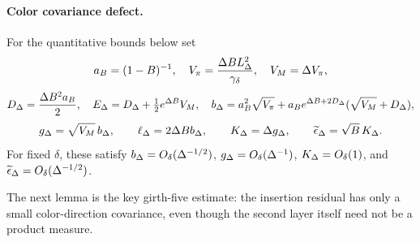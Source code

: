 \paragraph{Color covariance defect.}
For the quantitative bounds below set
\[
 a_B=(1-B)^{-1},\quad V_\pi=\frac{\Delta B L_\Delta^2}{\gamma_\delta},\quad
 V_M=\Delta V_\pi,
\]
\[
 D_\Delta=\frac{\Delta B^2a_B}{2},\quad
 E_\Delta=D_\Delta+\tfrac12e^{\Delta B}V_M,\quad
 b_\Delta=a_B^2\sqrt{V_\pi}+a_Be^{\Delta B+2D_\Delta}
 (\sqrt{V_M}+D_\Delta),
\]
\begin{equation}\label{eq:girth5-defect-constants}
 g_\Delta=\sqrt{V_M}\,b_\Delta,\qquad
 \ell_\Delta=2\Delta B b_\Delta,\qquad K_\Delta=\Delta g_\Delta,\qquad
 \widetilde\epsilon_\Delta=\sqrt B\,K_\Delta.
\end{equation}
For fixed $\delta$, these satisfy
$b_\Delta=O_\delta(\Delta^{-1/2})$, $g_\Delta=O_\delta(\Delta^{-1})$,
$K_\Delta=O_\delta(1)$, and
$\widetilde\epsilon_\Delta=O_\delta(\Delta^{-1/2})$.

The next lemma is the key girth-five estimate: the insertion residual has
only a small color-direction covariance, even though the second layer itself
need not be a product measure.

